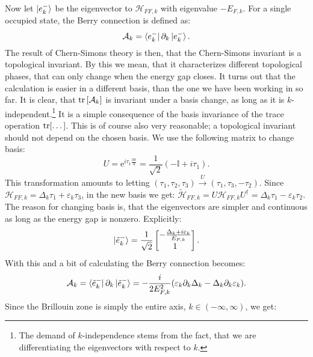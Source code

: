 Now let $\ket{e^{-}_k}$ be the eigenvector to $\mathcal{H}_{FF,k}$ with eigenvalue $-E_{F,k}$. For a single occupied state, the Berry connection is defined as:
\begin{equation}
\mathcal{A}_k = \bra{e^{-}_k}\partial_k\ket{e^{-}_k}. \nonumber
\end{equation}
The result of Chern-Simons theory is then, that the Chern-Simons invariant is a topological invariant. By this we mean, that it characterizes different topological phases, that can only change when the energy gap closes. It turns out that the calculation is easier in a different basis, than the one we have been working in so far. It is clear, that $\operatorname{tr}\left[\mathcal{A}_k\right]$ is invariant under a basis change, as long as it is $k$-independent.\footnote{The demand of $k$-independence stems from the fact, that we are differentiating the eigenvectors with respect to $k$.} It is a simple consequence of the basis invariance of the trace operation $\operatorname{tr}[\dots]$. This is of course also very reasonable; a topological invariant should not depend on the chosen basis. We use the following matrix to change basis:
\begin{equation}
U = \text{e}^{i\tau_1 \frac{3\pi}{4}} = \frac{1}{\sqrt{2}}\left(-\mathbb{I} + i\tau_1\right). \nonumber 
\end{equation}
This transformation amounts to letting $(\tau_1, \tau_2, \tau_3) \overset{U}{\to} (\tau_1, \tau_3, -\tau_2)$. Since $\mathcal{H}_{FF,k} = \Delta_k\tau_1 + \varepsilon_k\tau_3$, in the new basis we get: $\tilde{\mathcal{H}}_{FF,k} = U\mathcal{H}_{FF,k}U^\dagger = \Delta_k\tau_1 - \varepsilon_k\tau_2$. The reason for changing basis is, that the eigenvectors are simpler and continuous as long as the energy gap is nonzero. Explicitly:
\begin{equation}
\ket{\tilde{e}^{-}_k} = \frac{1}{\sqrt{2}}\begin{bmatrix} -\frac{\Delta_k + i \varepsilon_k}{E_{F,k}} \\ 1 \end{bmatrix}. \nonumber 
\end{equation}
With this and a bit of calculating the Berry connection becomes:
\begin{equation}
\mathcal{A}_k = \bra{\tilde{e}^{-}_k}\partial_k\ket{\tilde{e}^{-}_k} = -\frac{i}{2E^2_{F,k}}(\varepsilon_k\partial_k\Delta_k - \Delta_k \partial_k \varepsilon_k). \nonumber 
\end{equation}
Since the Brillouin zone is simply the entire axis, $k\in (-\infty, \infty)$, we get:
